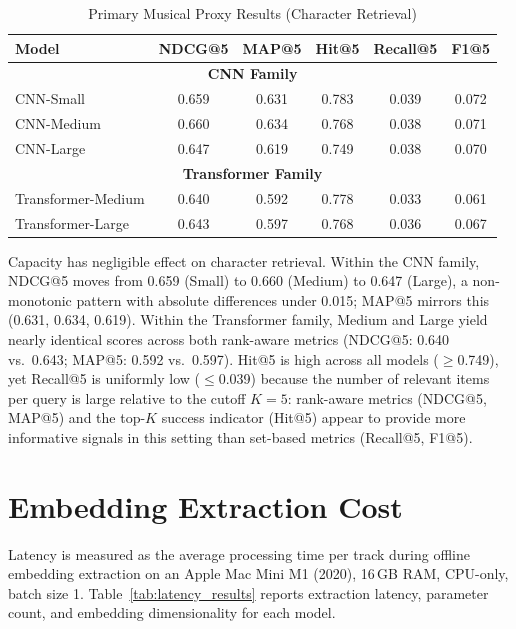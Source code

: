 \documentclass{CPP}
\begin{document}
\begin{table}[!htbp]
\centering
\caption{Primary Musical Proxy Results (Character Retrieval)}
\label{tab:musical_results}
\begin{tabular}{lccccc}
\hline
\textbf{Model} & \textbf{NDCG@5} & \textbf{MAP@5} & \textbf{Hit@5} & \textbf{Recall@5} & \textbf{F1@5} \\
\hline
\multicolumn{6}{c}{\textbf{CNN Family}} \\
\hline
CNN-Small  & 0.659 & 0.631 & 0.783 & 0.039 & 0.072 \\
CNN-Medium & 0.660 & 0.634 & 0.768 & 0.038 & 0.071 \\
CNN-Large  & 0.647 & 0.619 & 0.749 & 0.038 & 0.070 \\
\hline
\multicolumn{6}{c}{\textbf{Transformer Family}} \\
\hline
Transformer-Medium & 0.640 & 0.592 & 0.778 & 0.033 & 0.061 \\
Transformer-Large  & 0.643 & 0.597 & 0.768 & 0.036 & 0.067 \\
\hline
\end{tabular}
\end{table}

Capacity has negligible effect on character retrieval. Within the CNN family, NDCG@5 moves from 0.659 (Small) to 0.660 (Medium) to 0.647 (Large), a non-monotonic pattern with absolute differences under 0.015; MAP@5 mirrors this (0.631, 0.634, 0.619). Within the Transformer family, Medium and Large yield nearly identical scores across both rank-aware metrics (NDCG@5: 0.640 vs.\ 0.643; MAP@5: 0.592 vs.\ 0.597). Hit@5 is high across all models ($\geq$0.749), yet Recall@5 is uniformly low ($\leq$0.039) because the number of relevant items per query is large relative to the cutoff $K{=}5$: rank-aware metrics (NDCG@5, MAP@5) and the top-$K$ success indicator (Hit@5) appear to provide more informative signals in this setting than set-based metrics (Recall@5, F1@5).

\section{Embedding Extraction Cost}

Latency is measured as the average processing time per track during offline embedding extraction on an Apple Mac Mini M1 (2020), 16\,GB RAM, CPU-only, batch size 1. Table~\ref{tab:latency_results} reports extraction latency, parameter count, and embedding dimensionality for each model.
\end{document}
